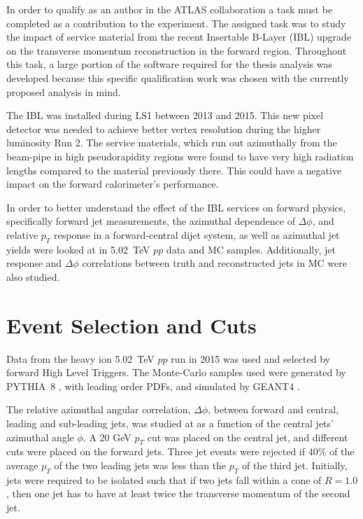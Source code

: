 In order to qualify as an author in the ATLAS collaboration a task must be completed as a contribution to the experiment. The assigned task was to study the  impact of service material from the recent Insertable B-Layer (IBL) upgrade on the transverse momentum reconstruction in the forward region. Throughout this task, a large portion of the software required for the thesis analysis was developed because this specific qualification work was chosen with the currently proposed analysis in mind. 

The IBL was installed during LS1 between 2013 and 2015. This new pixel detector was needed to achieve better vertex resolution during the higher luminosity Run 2. The service materials, which run out azimuthally from the beam-pipe in high pseudorapidity regions were found to have very high radiation lengths compared to the material previously there. This could have a negative impact on the forward calorimeter's performance.

In order to better understand the effect of the IBL services on forward physics, specifically forward jet measurements, the azimuthal dependence of $\Delta\phi$, and relative $p_{T}$ response in a forward-central dijet system, as well as azimuthal jet yields were looked at in 5.02~TeV $pp$ data and MC samples. Additionally, jet response and $\Delta\phi$ correlations between truth and reconstructed jets in MC were also studied.

\section{Event Selection and Cuts}
Data from the heavy ion 5.02~TeV $pp$ run in 2015 was used and selected by forward High Level Triggers.
The Monte-Carlo samples used were generated by PYTHIA~8 \cite{Sjostrand:2014zea}, with leading order PDFs, and simulated by GEANT4 \cite{Agostinelli:2002hh, Aad:2010ah}.

The relative azimuthal angular correlation, $\Delta\phi$, between forward and central, leading and sub-leading jets, was studied at as a function of the central jets' azimuthal angle $\phi$. A 20 GeV $p_{T}$ cut was placed on the central jet, and different cuts were placed on the forward jets. Three jet events were rejected if $40\%$ of the average $p_{T}$ of the two leading jets was less than the $p_{T}$ of the third jet. Initially, jets were required to be isolated such that if two jets fall within a cone of $R=1.0$, then one jet has to have at least twice the transverse momentum of the second jet. 

